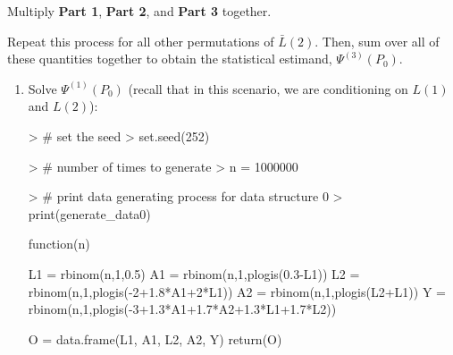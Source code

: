 \documentclass{exam}
\begin{document}
\begin{enumerate}
\begin{enumerate}
\begin{enumerate}
\end{enumerate}

Multiply \textbf{Part 1}, \textbf{Part 2}, and \textbf{Part 3} together.

\vspace{3mm}

\noindent Repeat this process for all other permutations of $\bar{L}(2)$. Then, sum over all of these quantities together to obtain the statistical estimand, $\Psi^{(3)}(P_0)$.

\end{enumerate}


\end{enumerate}

\begin{solution}

\begin{enumerate}

\item Solve $\Psi^{(1)}(P_0)$ (recall that in this scenario, we are conditioning on $L(1)$ and $L(2)$):


\begin{Schunk}
\begin{Sinput}
> # set the seed
> set.seed(252)
\end{Sinput}
\end{Schunk}
\begin{Schunk}
\begin{Sinput}
> # number of times to generate
> n = 1000000
\end{Sinput}
\end{Schunk}
\begin{Schunk}
\begin{Sinput}
> # print data generating process for data structure 0
> print(generate_data0)
\end{Sinput}
\begin{Soutput}
function(n){
  
  L1 = rbinom(n,1,0.5)
  A1 = rbinom(n,1,plogis(0.3-L1))
  L2 = rbinom(n,1,plogis(-2+1.8*A1+2*L1))
  A2 = rbinom(n,1,plogis(L2+L1))
  Y = rbinom(n,1,plogis(-3+1.3*A1+1.7*A2+1.3*L1+1.7*L2))
  
  O = data.frame(L1, A1, L2, A2, Y)
  return(O)
  
}
\end{Soutput}
\end{Schunk}
\end{enumerate}
\end{solution}
\end{document}
